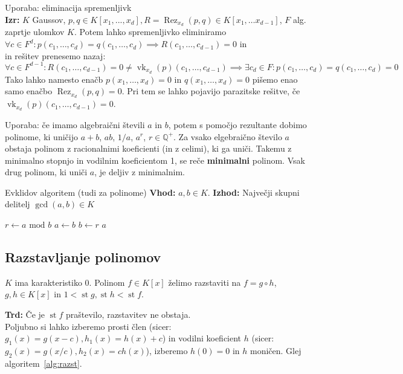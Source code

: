 \documentclass[a4paper,oneside,10pt]{article}
\theoremstyle{definition}
\newcommand{\Q}{\ensuremath{\mathbb{Q}}}
\newcommand{\st}{\operatorname{st}}
\newcommand{\rez}{\operatorname{Rez}}
\newcommand{\vk}{\operatorname{vk}}
\let\oldtextbf\textbf
\renewcommand{\textbf}[1]{\oldtextbf{\boldmath #1}}
\begin{document}
Uporaba: eliminacija spremenljivk\\
\textbf{Izr:} $K$ Gaussov, $p, q \in K[x_1, ...,x_d], R = \rez_{x_d}(p, q) \in K[x_1, \ldots x_{d-1}]$, $F$ alg. zaprtje ulomkov $K$. Potem lahko spremenljivko eliminiramo \\
$\forall c \in F^d \colon p(c_1, \ldots, c_d) = q(c_1, \ldots, c_d) \implies R(c_1, \ldots, c_{d-1}) = 0$ in \\
in rešitev prenesemo nazaj: $\forall c \in F^{d-1} \colon R(c_1, \ldots, c_{d-1}) = 0 \neq \vk_{x_d}(p)(c_1, \ldots, c_{d-1})\implies \exists c_d \in F \colon p(c_1, \ldots, c_d) = q(c_1, \ldots,c_d) = 0$\\
Tako lahko namesto enačb $p(x_1, \ldots, x_d) = 0$ in $q(x_1, \ldots, x_d) = 0$ pišemo enao samo enačbo $\rez_{x_d}(p, q) = 0$. Pri tem se lahko pojavijo parazitske rešitve, če $\vk_{x_d}(p)(c_1, \ldots, c_{d-1}) = 0$.

Uporaba: če imamo algebraični števili $a$ in $b$, potem s pomočjo rezultante dobimo polinome, ki uničijo $a+b$, $ab$, $1/a$, $a^r$,
$r \in \Q^+$. Za vsako elgebraično število $a$ obstaja polinom z
racionalnimi koeficienti (in z celimi), ki ga uniči. Takemu z
minimalno stopnjo in vodilnim koeficientom 1, se reče
\textbf{minimalni} polinom. Vsak drug polinom, ki uniči $a$, je
deljiv z minimalnim.

\begin{algorithm}[!ht]
\caption{Evklidov algoritem (tudi za polinome) \newline
\textbf{Vhod:} $a, b \in K$. \newline
\textbf{Izhod:} Največji skupni delitelj $\gcd(a, b) \in K$}
\label{alg:evk}
\begin{algorithmic}[1]
\State $r \gets a \text{ mod } b$
\State $a \gets b$
\State $b \gets r$
\EndWhile
\State \Return $a$
\EndProcedure
\end{algorithmic}
\end{algorithm}

\subsection*{Razstavljanje polinomov}
$K$ ima karakteristiko 0. Polinom $f \in K[x]$ želimo razstaviti na
$f = g \circ h$, $g, h \in K[x]$ in $1 < \st g,\st h < \st f$.

\textbf{Trd: } Če je $\st f$ praštevilo, razstavitev ne obstaja.  \\
Poljubno si lahko izberemo prosti člen (sicer: $g_1(x) = g(x-c), h_1(x) = h(x) + c$) in vodilni koeficient $h$ (sicer: $g_2(x) = g(x/c), h_2(x) = ch(x)$), izberemo $h(0) = 0$ in $h$ moničen.
Glej algoritem~\ref{alg:razst}.
\end{document}
